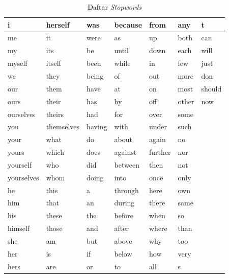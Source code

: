 \documentclass[../Book.tex]{subfiles}
\begin{document}
	\begin{table}[H]
		\centering
		\caption{Daftar \textit{Stopwords}}
		\label{stopwords}
		\begin{tabular}{|l|l|l|l|l|l|l|}
			\hline
			i          & herself    & was    & because & from    & any   & t      \\ \hline
			me         & it         & were   & as      & up      & both  & can    \\ \hline
			my         & its        & be     & until   & down    & each  & will   \\ \hline
			myself     & itself     & been   & while   & in      & few   & just   \\ \hline
			we         & they       & being  & of      & out     & more  & don    \\ \hline
			our        & them       & have   & at      & on      & most  & should \\ \hline
			ours       & their      & has    & by      & off     & other & now    \\ \hline
			ourselves  & theirs     & had    & for     & over    & some  &        \\ \hline
			you        & themselves & having & with    & under   & such  &        \\ \hline
			your       & what       & do     & about   & again   & no    &        \\ \hline
			yours      & which      & does   & against & further & nor   &        \\ \hline
			yourself   & who        & did    & between & then    & not   &        \\ \hline
			yourselves & whom       & doing  & into    & once    & only  &        \\ \hline
			he         & this       & a      & through & here    & own   &        \\ \hline
			him        & that       & an     & during  & there   & same  &        \\ \hline
			his        & these      & the    & before  & when    & so    &        \\ \hline
			himself    & those      & and    & after   & where   & than  &        \\ \hline
			she        & am         & but    & above   & why     & too   &        \\ \hline
			her        & is         & if     & below   & how     & very  &        \\ \hline
			hers       & are        & or     & to      & all     & s     &        \\ \hline
		\end{tabular}
	\end{table}
\end{document}
